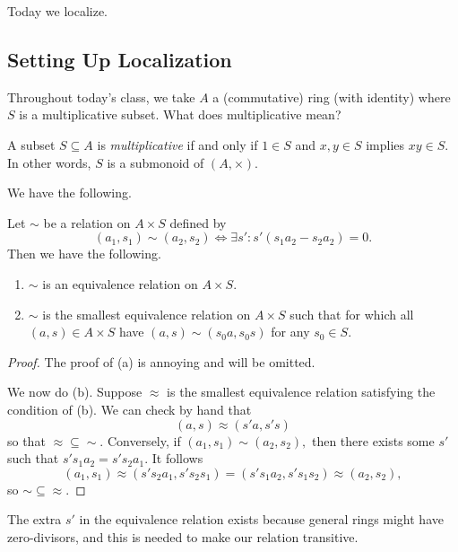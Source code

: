 \documentclass[../notes.tex]{subfiles}
\begin{document}












Today we localize.

\subsection{Setting Up Localization}
Throughout today's class, we take $A$ a (commutative) ring (with identity) where $S$ is a multiplicative subset. What does multiplicative mean?
\begin{definition}[Multiplicative]
    A subset $S\subseteq A$ is \textit{multiplicative} if and only if $1\in S$ and $x,y\in S$ implies $xy\in S.$ In other words, $S$ is a submonoid of $(A,\times).$
\end{definition}
We have the following.
\begin{proposition}
    Let $\sim$ be a relation on $A\times S$ defined by
    \[(a_1,s_1)\sim(a_2,s_2)\iff\exists s':s'(s_1a_2-s_2a_2)=0.\]
    Then we have the following.
    \begin{enumerate}[label=(\alph*)]
        \item $\sim$ is an equivalence relation on $A\times S.$
        \item $\sim$ is the smallest equivalence relation on $A\times S$ such that for which all $(a,s)\in A\times S$ have $(a,s)\sim(s_0a,s_0s)$ for any $s_0\in S.$
    \end{enumerate}
\end{proposition}
\begin{proof}
    The proof of (a) is annoying and will be omitted.

    We now do (b). Suppose $\approx$ is the smallest equivalence relation satisfying the condition of (b). We can check by hand that
    \[(a,s)\approx(s'a,s's)\]
    so that $\approx\subseteq\sim.$ Conversely, if $(a_1,s_1)\sim(a_2,s_2),$ then there exists some $s'$ such that $s's_1a_2=s's_2a_1.$ It follows
    \[(a_1,s_1)\approx(s's_2a_1,s's_2s_1)=(s's_1a_2,s's_1s_2)\approx(a_2,s_2),\]
    so $\sim\subseteq\approx.$
\end{proof}
\begin{remark}
    The extra $s'$ in the equivalence relation exists because general rings might have zero-divisors, and this is needed to make our relation transitive.
\end{remark}
\end{document}
